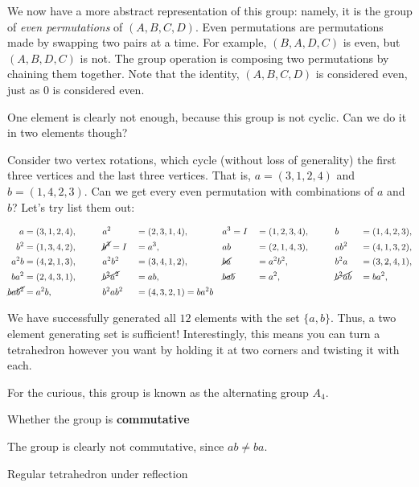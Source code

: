 \documentclass[../gatm_answers.tex]{subfiles}
\begin{document}
We now have a more abstract representation of this group: namely, it is the group of \textit{even permutations} of $(A,B,C,D)$. Even permutations are permutations made by swapping two pairs at a time. For example, $(B,A,D,C)$ is even, but $(A,B,D,C)$ is not. The group operation is composing two permutations by chaining them together. Note that the identity, $(A,B,C,D)$ is considered even, just as $0$ is considered even.

One element is clearly not enough, because this group is not cyclic. Can we do it in two elements though?

Consider two vertex rotations, which cycle (without loss of generality) the first three vertices and the last three vertices. That is, $a=(3,1,2,4)$ and $b=(1,4,2,3)$. Can we get every even permutation with combinations of $a$ and $b$? Let's try list them out:

\begin{alignat*}{9}
a &=(3,1,2,4), \qquad &&a^2&&=(2,3,1,4), \qquad &&a^3=I&&=(1,2,3,4), \qquad  &&b&&=(1,4,2,3), \\
b^2&=(1,3,4,2), &&\cancel{b^3}=I&&=a^3, &&ab&&=(2,1,4,3), &&ab^2&&=(4,1,3,2), \\
a^2b&=(4,2,1,3), &&a^2b^2&&=(3,4,1,2), &&\cancel{ba}&&=a^2b^2, &&b^2a&&=(3,2,4,1), \\
ba^2&=(2,4,3,1), &&\cancel{b^2a^2}&&=ab, &&\cancel{bab}&&=a^2, &&\cancel{b^2ab}&&=ba^2, \\
\cancel{bab^2}&=a^2b, &&b^2ab^2&&=(4,3,2,1)=ba^2b &&\\
\end{alignat*}

We have successfully generated all $12$ elements with the set $\{a,b\}$. Thus, a two element generating set is sufficient! Interestingly, this means you can turn a tetrahedron however you want by holding it at two corners and twisting it with each.

For the curious, this group is known as the alternating group $A_4$.

\begin{inner_problem}
\item Whether the group is \textbf{commutative}
\end{inner_problem}

The group is clearly not commutative, since $ab\neq ba$.

\begin{outer_problem}
\item Regular tetrahedron under reflection
\end{outer_problem}
\end{document}
